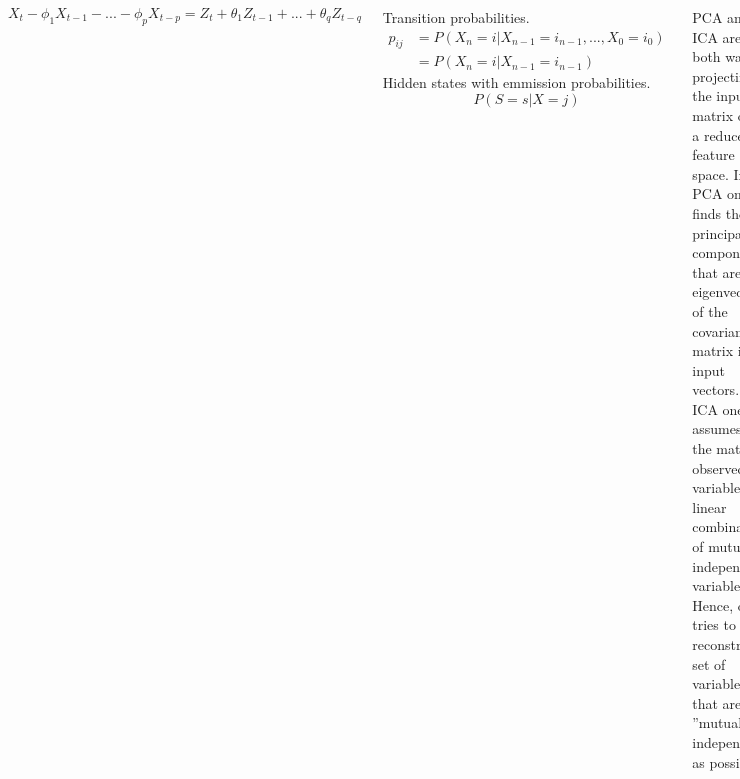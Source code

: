 \documentclass[18pt, a3paper, portrait]{tikzposter}
\begin{document}
\begin{columns}
    {
        \begin{equation}
            X_t - \phi_1 X_{t-1} - ... - \phi_p X_{t-p} = Z_{t} + \theta_1 Z_{t-1} + ... + \theta_q Z_{t-q}
        \end{equation}
    }

    {
        Transition probabilities.
        \begin{equation}
            \begin{split}
                p_{ij}  &= P(X_n = i | X_{n-1} = i_{n-1},..., X_{0} = i_{0}) \\
                        &= P(X_n = i | X_{n-1} = i_{n-1})      
            \end{split}
            \label{eq:markov_property}
        \end{equation}
        Hidden states with emmission probabilities.
        \begin{equation}
            P(S = s | X = j)
        \end{equation}
    }

    {
        PCA and ICA are both ways of projecting the input matrix onto a reduced feature space.
        In PCA one finds the principal components that are the eigenvectors of the covariance matrix if the input vectors.
        In ICA one assumes that the matrix of observed variables is a linear combination of mutually independent variables.
        Hence, one tries to reconstruct a set of variables that are as ''mutually independent'' as possible.

    }
\end{columns}
\end{document}
